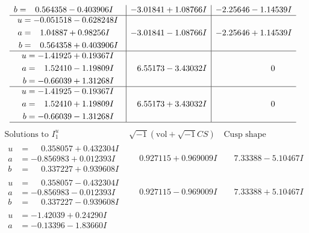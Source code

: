 \documentclass[1p]{elsarticle_modified}
\theoremstyle{definition}
\newcommand{\I}{\sqrt{-1}}
\begin{document}
$$\begin{array}{c|c|c}
\begin{aligned}
b &= \phantom{-}0.564358 - 0.403906 I\end{aligned}
 & -3.01841 + 1.08766 I & -2.25646 - 1.14539 I \\ \hline\begin{aligned}
u &= -0.051518 - 0.628248 I \\
a &= \phantom{-}1.04887 + 0.98256 I \\
b &= \phantom{-}0.564358 + 0.403906 I\end{aligned}
 & -3.01841 - 1.08766 I & -2.25646 + 1.14539 I \\ \hline\begin{aligned}
u &= -1.41925 + 0.19367 I \\
a &= \phantom{-}1.52410 - 1.19809 I \\
b &= -0.66039 + 1.31268 I\end{aligned}
 & \phantom{-}6.55173 - 3.43032 I & \phantom{-0.000000 } 0 \\ \hline\begin{aligned}
u &= -1.41925 - 0.19367 I \\
a &= \phantom{-}1.52410 + 1.19809 I \\
b &= -0.66039 - 1.31268 I\end{aligned}
 & \phantom{-}6.55173 + 3.43032 I & \phantom{-0.000000 } 0\\
 \hline 
 \end{array}$$\newpage$$\begin{array}{c|c|c}  
\text{Solutions to }I^u_{1}& \I (\text{vol} + \sqrt{-1}CS) & \text{Cusp shape}\\
 \hline 
\begin{aligned}
u &= \phantom{-}0.358057 + 0.432304 I \\
a &= -0.856983 + 0.012393 I \\
b &= \phantom{-}0.337227 + 0.939608 I\end{aligned}
 & \phantom{-}0.927115 + 0.969009 I & \phantom{-}7.33388 - 5.10467 I \\ \hline\begin{aligned}
u &= \phantom{-}0.358057 - 0.432304 I \\
a &= -0.856983 - 0.012393 I \\
b &= \phantom{-}0.337227 - 0.939608 I\end{aligned}
 & \phantom{-}0.927115 - 0.969009 I & \phantom{-}7.33388 + 5.10467 I \\ \hline\begin{aligned}
u &= -1.42039 + 0.24290 I \\
a &= -0.13396 - 1.83660 I \\

\end{aligned}
\end{array}$$
\end{document}
